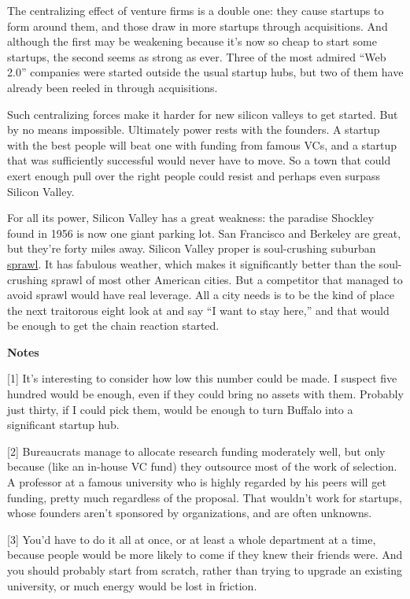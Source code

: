 The centralizing effect of venture firms is a double one: they cause
startups to form around them, and those draw in more startups through
acquisitions. And although the first may be weakening because it's now
so cheap to start some startups, the second seems as strong as ever.
Three of the most admired ``Web 2.0'' companies were started outside the
usual startup hubs, but two of them have already been reeled in through
acquisitions.

Such centralizing forces make it harder for new silicon valleys to get
started. But by no means impossible. Ultimately power rests with the
founders. A startup with the best people will beat one with funding from
famous VCs, and a startup that was sufficiently successful would never
have to move. So a town that could exert enough pull over the right
people could resist and perhaps even surpass Silicon Valley.

For all its power, Silicon Valley has a great weakness: the paradise
Shockley found in 1956 is now one giant parking lot. San Francisco and
Berkeley are great, but they're forty miles away. Silicon Valley proper
is soul-crushing suburban
\href{http://www.flickr.com/photos/caterina/34637/}{sprawl}. It has
fabulous weather, which makes it significantly better than the
soul-crushing sprawl of most other American cities. But a competitor
that managed to avoid sprawl would have real leverage. All a city needs
is to be the kind of place the next traitorous eight look at and say ``I
want to stay here,'' and that would be enough to get the chain reaction
started.

\textbf{Notes}

{[}1{]} It's interesting to consider how low this number could be made.
I suspect five hundred would be enough, even if they could bring no
assets with them. Probably just thirty, if I could pick them, would be
enough to turn Buffalo into a significant startup hub.

{[}2{]} Bureaucrats manage to allocate research funding moderately well,
but only because (like an in-house VC fund) they outsource most of the
work of selection. A professor at a famous university who is highly
regarded by his peers will get funding, pretty much regardless of the
proposal. That wouldn't work for startups, whose founders aren't
sponsored by organizations, and are often unknowns.

{[}3{]} You'd have to do it all at once, or at least a whole department
at a time, because people would be more likely to come if they knew
their friends were. And you should probably start from scratch, rather
than trying to upgrade an existing university, or much energy would be
lost in friction.

